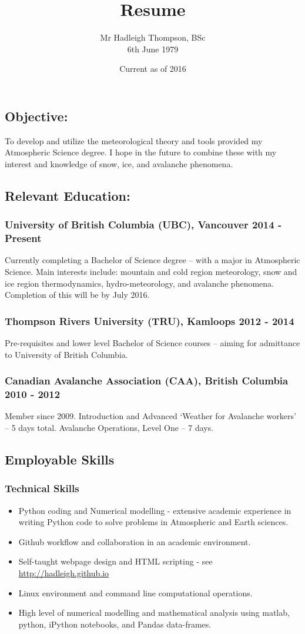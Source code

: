 \documentclass[]{article}
\title{Resume}
\author{Mr Hadleigh Thompson, BSc \\ 6th June 1979}
\date{Current as of 2016}
\begin{document}
\maketitle

\subsection*{Objective:}  
To develop and utilize the meteorological theory and tools provided my Atmospheric Science degree. I
hope in the future to combine these with my interest and knowledge of snow, ice, and avalanche
phenomena.

\subsection*{Relevant Education:}
\subsubsection*{University of British Columbia (UBC), Vancouver 2014 - Present}
Currently completing a Bachelor of Science degree – with a major in Atmospheric Science. Main
interests include: mountain and cold region meteorology, snow and ice region thermodynamics,
hydro-meteorology, and avalanche phenomena. Completion of this will be by July 2016.
\subsubsection*{Thompson Rivers University (TRU), Kamloops 2012 - 2014}
Pre-requisites and lower level Bachelor of Science courses – aiming for admittance to University of British
Columbia.
\subsubsection*{Canadian Avalanche Association (CAA), British Columbia 2010 - 2012}
Member since 2009. Introduction and Advanced ‘Weather for Avalanche workers’ – 5 days total. Avalanche Operations, Level One – 7 days.

\subsection*{Employable Skills}
\subsubsection*{Technical Skills}
\begin{itemize}
\item Python coding and Numerical modelling - extensive academic experience in writing Python code to solve problems in Atmospheric and Earth sciences.
\item Github workflow and collaboration in an academic environment.
\item Self-taught webpage design and HTML scripting - see \url{http://hadleigh.github.io}
\item Linux environment and command line computational operations.
\item High level of numerical modelling and mathematical analysis using matlab, python, iPython notebooks, and Pandas data-frames.
\end{itemize}
\end{document}
